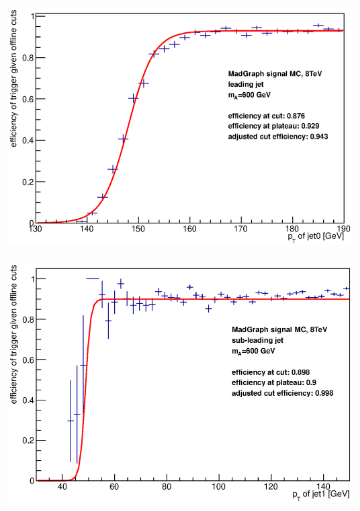 \begin{figure}[phtb!]
  \begin{center}
  \begin{subfigure}[leading jet, $m_{A}=600$ GeV]{0.4\textwidth}\includegraphics[width=\textwidth]{Systematics/images/jet0_trigger_turn_on_bAbb_600_j35.eps}\end{subfigure}
  \begin{subfigure}[sub-leading jet, $m_{A}=600$ GeV]{0.4\textwidth}\includegraphics[width=\textwidth]{Systematics/images/jet1_trigger_turn_on_bAbb_600_j35.eps}\end{subfigure}

\end{center}
\end{figure}

